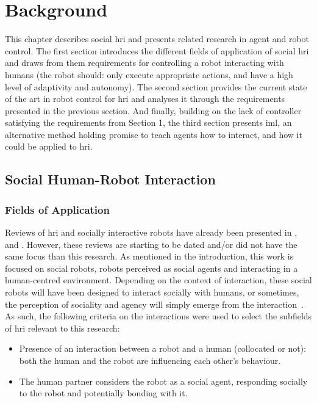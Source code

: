 \chapter{Background} \label{chap:background}
\glsresetall

This chapter describes social \gls{hri} and presents related research in agent and robot control. The first section introduces the different fields of application of social \gls{hri} and draws from them requirements for controlling a robot interacting with humans (the robot should: only execute appropriate actions, and have a high level of adaptivity and autonomy). The second section provides the current state of the art in robot control for \gls{hri} and analyses it through the requirements presented in the previous section. And finally, building on the lack of controller satisfying the requirements from Section 1, the third section presents \gls{iml}, an alternative method holding promise to teach agents how to interact, and how it could be applied to \gls{hri}.

\section{Social Human-Robot Interaction}

\subsection{Fields of Application} \label{ssec:back_hri}

Reviews of \gls{hri} and socially interactive robots have already been presented in \cite{fong2003survey}, \cite{goodrich2007human} and \cite{sheridan2016human}. However, these reviews are starting to be dated and/or did not have the same focus than this research. As mentioned in the introduction, this work is focused on social robots, robots perceived as social agents and interacting in a human-centred environment. Depending on the context of interaction, these social robots will have been designed to interact socially with humans, or sometimes, the perception of sociality and agency will simply emerge from the interaction~\citep{fincannon2004evidence}. As such, the following criteria on the interactions were used to select the subfields of \gls{hri} relevant to this research:
\begin{itemize}
	\item Presence of an interaction between a robot and a human (collocated or not): both the human and the robot are influencing each other's behaviour.
	\item The human partner considers the robot as a social agent, responding socially to the robot and potentially bonding with it.
\end{itemize}

